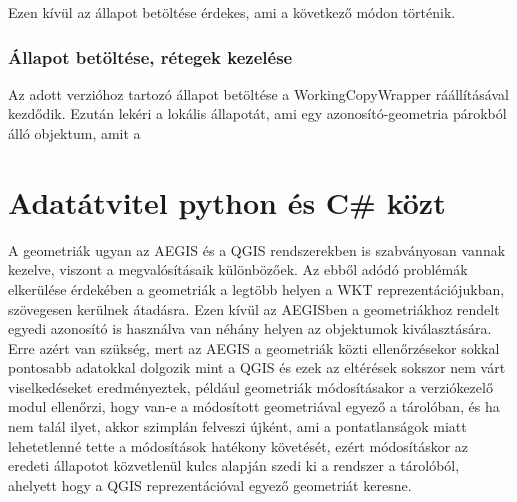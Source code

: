 Ezen kívül az állapot betöltése érdekes, ami a következő módon történik.
\subsubsection{Állapot betöltése, rétegek kezelése}
Az adott verzióhoz tartozó állapot betöltése a WorkingCopyWrapper ráállításával kezdődik. Ezután lekéri a lokális állapotát, ami egy azonosító-geometria párokból álló objektum, amit a  


\section{Adatátvitel python és C\# közt}
A geometriák ugyan az AEGIS és a QGIS rendszerekben is szabványosan vannak kezelve, viszont a megvalósításaik különbözőek. Az ebből adódó problémák elkerülése érdekében a geometriák a legtöbb helyen a WKT reprezentációjukban, szövegesen kerülnek átadásra. Ezen kívül az AEGISben a geometriákhoz rendelt egyedi azonosító is használva van néhány helyen az objektumok kiválasztására. Erre azért van szükség, mert az AEGIS a geometriák közti ellenőrzésekor sokkal pontosabb adatokkal dolgozik mint a QGIS és ezek az eltérések sokszor nem várt viselkedéseket eredményeztek, például geometriák módosításakor a verziókezelő modul ellenőrzi, hogy van-e a módosított geometriával egyező a tárolóban, és ha nem talál ilyet, akkor szimplán felveszi újként, ami a pontatlanságok miatt lehetetlenné tette a módosítások hatékony követését, ezért módosításkor az eredeti állapotot közvetlenül kulcs alapján szedi ki a rendszer a tárolóból, ahelyett hogy a QGIS reprezentációval egyező geometriát keresne.




